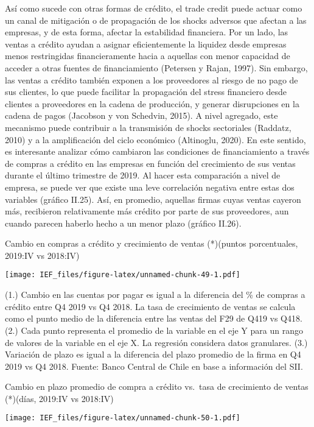 \documentclass[
]{book}
\begin{document}
Así como sucede con otras formas de crédito, el trade credit
puede actuar como un canal de mitigación o de propagación de
los shocks adversos que afectan a las empresas, y de esta forma,
afectar la estabilidad financiera. Por un lado, las ventas a crédito
ayudan a asignar eficientemente la liquidez desde empresas
menos restringidas financieramente hacia a aquellas con menor
capacidad de acceder a otras fuentes de financiamiento (Petersen
y Rajan, 1997). Sin embargo, las ventas a crédito también
exponen a los proveedores al riesgo de no pago de sus clientes,
lo que puede facilitar la propagación del stress financiero desde
clientes a proveedores en la cadena de producción, y generar
disrupciones en la cadena de pagos (Jacobson y von Schedvin,
2015). A nivel agregado, este mecanismo puede contribuir
a la transmisión de shocks sectoriales (Raddatz, 2010) y a la
amplificación del ciclo económico (Altinoglu, 2020).
En este sentido, es interesante analizar cómo cambiaron las
condiciones de financiamiento a través de compras a crédito en
las empresas en función del crecimiento de sus ventas durante
el último trimestre de 2019. Al hacer esta comparación a nivel
de empresa, se puede ver que existe una leve correlación
negativa entre estas dos variables (gráfico II.25). Así, en
promedio, aquellas firmas cuyas ventas cayeron más, recibieron
relativamente más crédito por parte de sus proveedores, aun
cuando parecen haberlo hecho a un menor plazo (gráfico II.26).

Cambio en compras a crédito y crecimiento de ventas (*)(puntos porcentuales, 2019:IV vs 2018:IV)

\texttt{[image: IEF\_files/figure-latex/unnamed-chunk-49-1.pdf]}

(1.) Cambio en las cuentas por pagar es igual a la diferencia del \% de compras a crédito entre Q4 2019 vs Q4 2018. La tasa de crecimiento de ventas se calcula como el punto medio de la diferencia entre las ventas del F29 de Q419 vs Q418.
(2.) Cada punto representa el promedio de la variable en el eje Y para un rango de valores de la variable en el eje X. La regresión considera datos granulares.
(3.) Variación de plazo es igual a la diferencia del plazo promedio de la firma en Q4 2019 vs Q4 2018.
Fuente: Banco Central de Chile en base a información del SII.

Cambio en plazo promedio de compra a crédito vs.~tasa de crecimiento de ventas (*)(días, 2019:IV vs 2018:IV)

\texttt{[image: IEF\_files/figure-latex/unnamed-chunk-50-1.pdf]}
\end{document}
